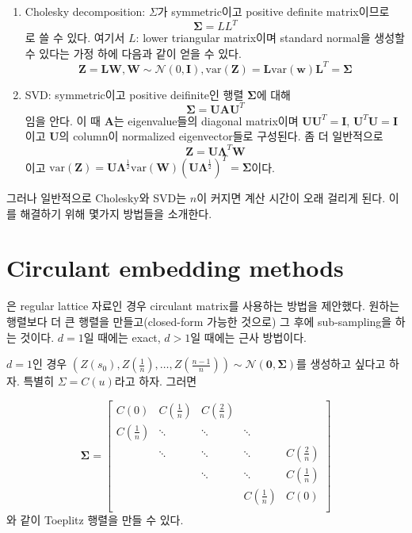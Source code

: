\documentclass[b5paper,]{scrbook}
\theoremstyle{plain}
\theoremstyle{definition}
\numberwithin{equation}{section}
\begin{document}
\begin{enumerate}
\def\labelenumi{\arabic{enumi}.}
\item
  Cholesky decomposition: \(\Sigma\)가 symmetric이고 positive definite matrix이므로
  \[\boldsymbol{\Sigma} =LL^{T}\]
  로 쓸 수 있다. 여기서 \(L\): lower triangular matrix이며 standard normal을 생성할 수 있다는 가정 하에 다음과 같이 얻을 수 있다.
  \[\mathbf{Z}=\mathbf{LW}, \mathbf{W}\sim\mathcal{N}(0,\mathbf{I}), \text{var}(\mathbf{Z})=\mathbf{L}\text{var}(\mathbf{w})\mathbf{L}^{T}=\boldsymbol{\Sigma}\]
\item
  SVD: symmetric이고 positive deifinite인 행렬 \(\boldsymbol{\Sigma}\)에 대해
  \[\boldsymbol{\Sigma}=\mathbf{UAU}^{T}\]
  임을 안다. 이 때 \(\mathbf{A}\)는 eigenvalue들의 diagonal matrix이며 \(\mathbf{U}\mathbf{U}^{T}=\mathbf{I}\), \(\mathbf{U}^{T}\mathbf{U}=\mathbf{I}\)이고 \(\mathbf{U}\)의 column이 normalized eigenvector들로 구성된다. 좀 더 일반적으로
  \[\mathbf{Z}=\mathbf{U}\boldsymbol{\Lambda}^{T}\mathbf{W}\]
  이고 \(\text{var}(\mathbf{Z})=\mathbf{U}\boldsymbol{\Lambda}^{\frac{1}{2}}\text{var}(\mathbf{W})(\mathbf{U}\boldsymbol{\Lambda}^{\frac{1}{2}})^{T}=\boldsymbol{\Sigma}\)이다.
\end{enumerate}

그러나 일반적으로 Cholesky와 SVD는 \(n\)이 커지면 계산 시간이 오래 걸리게 된다. 이를 해결하기 위해 몇가지 방법들을 소개한다.

\hypertarget{circulant-embedding-methods}{%
\section{Circulant embedding methods}\label{circulant-embedding-methods}}

\citep{Chan1997}은 regular lattice 자료인 경우 circulant matrix를 사용하는 방법을 제안했다. 원하는 행렬보다 더 큰 행렬을 만들고(closed-form 가능한 것으로) 그 후에 sub-sampling을 하는 것이다. \(d=1\)일 때에는 exact, \(d>1\)일 때에는 근사 방법이다.

\(d=1\)인 경우 \((Z(s_{0}), Z(\frac{1}{n}),\ldots, Z(\frac{n-1}{n}))\sim\mathcal{N}(\mathbf{0},\boldsymbol{\Sigma})\)를 생성하고 싶다고 하자. 특별히 \(\Sigma=C(u)\)라고 하자. 그러면

\[
\boldsymbol{\Sigma}=
\begin{bmatrix}
C(0) & C(\frac{1}{n}) & C(\frac{2}{n}) &  &  \\
C(\frac{1}{n}) & \ddots & \ddots & \ddots &  \\
 & \ddots & \ddots & \ddots & C(\frac{2}{n}) \\
 &  & \ddots & \ddots & C(\frac{1}{n}) \\
 &  &  & C(\frac{1}{n}) & C(0) \\
\end{bmatrix}
\]
와 같이 Toeplitz 행렬을 만들 수 있다.
\end{document}
